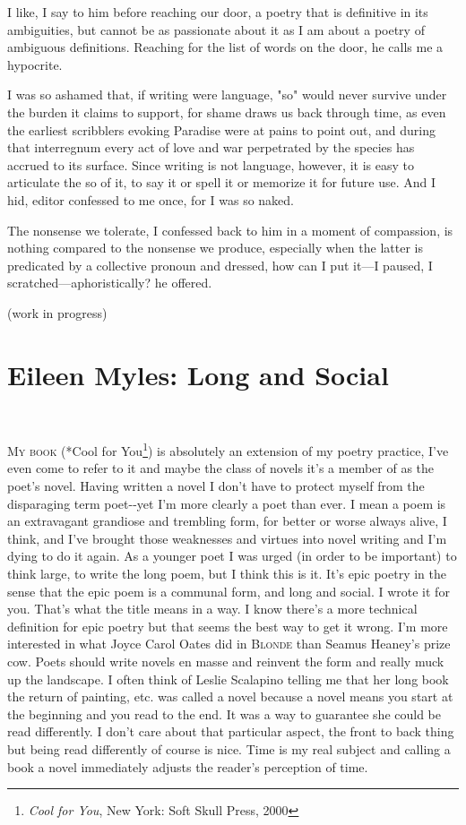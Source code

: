 \documentclass[
]{memoir}
\begin{document}
I like, I say to him before reaching our door, a poetry that is
definitive in its ambiguities, but cannot be as passionate about it as I
am about a poetry of ambiguous definitions. Reaching for the list of
words on the door, he calls me a hypocrite.

I was so ashamed that, if writing were language, "so" would never
survive under the burden it claims to support, for shame draws us back
through time, as even the earliest scribblers evoking Paradise were at
pains to point out, and during that interregnum every act of love and
war perpetrated by the species has accrued to its surface. Since writing
is not language, however, it is easy to articulate the so of it, to say
it or spell it or memorize it for future use. And I hid, editor
confessed to me once, for I was so naked.

The nonsense we tolerate, I confessed back to him in a moment of
compassion, is nothing compared to the nonsense we produce, especially
when the latter is predicated by a collective pronoun and dressed, how
can I put it---I paused, I scratched---aphoristically? he offered.

(work in progress)

\hypertarget{eileen-myles-long-and-social}{%
\chapter{Eileen Myles: Long and
Social}\label{eileen-myles-long-and-social}}

~

\lettrine[lines=3, findent=0em, nindent=0.1em, lhang=0]{M}{y book}
(*Cool for You\footnote{\emph{Cool for You}, New York: Soft Skull Press,
  2000}) is absolutely an extension of my poetry practice, I've even
come to refer to it and maybe the class of novels it's a member of as
the poet's novel. Having written a novel I don't have to protect myself
from the disparaging term poet-\/-yet I'm more clearly a poet than ever.
I mean a poem is an extravagant grandiose and trembling form, for better
or worse always alive, I think, and I've brought those weaknesses and
virtues into novel writing and I'm dying to do it again. As a younger
poet I was urged (in order to be important) to think large, to write the
long poem, but I think this is it. It's epic poetry in the sense that
the epic poem is a communal form, and long and social. I wrote it for
you. That's what the title means in a way. I know there's a more
technical definition for epic poetry but that seems the best way to get
it wrong. I'm more interested in what Joyce Carol Oates did in
\textsc{Blonde} than Seamus Heaney's prize cow. Poets should write
novels en masse and reinvent the form and really muck up the landscape.
I often think of Leslie Scalapino telling me that her long book the
return of painting, etc. was called a novel because a novel means you
start at the beginning and you read to the end. It was a way to
guarantee she could be read differently. I don't care about that
particular aspect, the front to back thing but being read differently of
course is nice. Time is my real subject and calling a book a novel
immediately adjusts the reader's perception of time.
\end{document}
